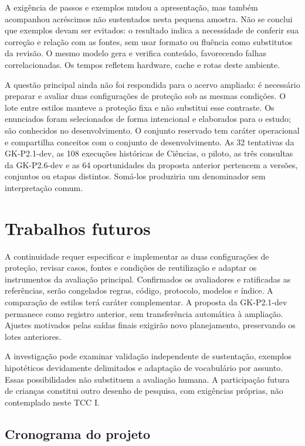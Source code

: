 A exigência de passos e exemplos mudou a apresentação, mas também acompanhou acréscimos não sustentados nesta pequena amostra. Não se conclui que exemplos devam ser evitados: o resultado indica a necessidade de conferir sua correção e relação com as fontes, sem usar formato ou fluência como substitutos da revisão. O mesmo modelo gera e verifica conteúdo, favorecendo falhas correlacionadas. Os tempos refletem hardware, cache e rotas deste ambiente.

A questão principal ainda não foi respondida para o acervo ampliado: é necessário preparar e avaliar duas configurações de proteção sob as mesmas condições. O lote entre estilos manteve a proteção fixa e não substitui esse contraste. Os enunciados foram selecionados de forma intencional e elaborados para o estudo; são conhecidos no desenvolvimento. O conjunto reservado tem caráter operacional e compartilha conceitos com o conjunto de desenvolvimento. As 32 tentativas da GK-P2.1-dev, as 108 execuções históricas de Ciências, o piloto, as três consultas da GK-P2.6-dev e as 64 oportunidades da proposta anterior pertencem a versões, conjuntos ou etapas distintos. Somá-los produziria um denominador sem interpretação comum.

\section{Trabalhos futuros}

A continuidade requer especificar e implementar as duas configurações de proteção, revisar casos, fontes e condições de reutilização e adaptar os instrumentos da avaliação principal. Confirmados os avaliadores e ratificadas as referências, serão congelados regras, código, protocolo, modelos e índice. A comparação de estilos terá caráter complementar. A proposta da GK-P2.1-dev permanece como registro anterior, sem transferência automática à ampliação. Ajustes motivados pelas saídas finais exigirão novo planejamento, preservando os lotes anteriores.

A investigação pode examinar validação independente de sustentação, exemplos hipotéticos devidamente delimitados e adaptação de vocabulário por assunto. Essas possibilidades não substituem a avaliação humana. A participação futura de crianças constitui outro desenho de pesquisa, com exigências próprias, não contemplado neste TCC I.

\subsection{Cronograma do projeto}


